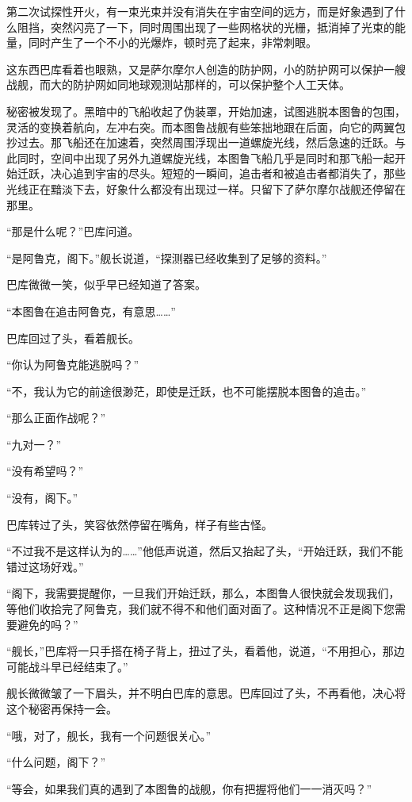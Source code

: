 第二次试探性开火，有一束光束并没有消失在宇宙空间的远方，而是好象遇到了什么阻挡，突然闪亮了一下，同时周围出现了一些网格状的光栅，抵消掉了光束的能量，同时产生了一个不小的光爆炸，顿时亮了起来，非常刺眼。 

这东西巴库看着也眼熟，又是萨尔摩尔人创造的防护网，小的防护网可以保护一艘战舰，而大的防护网如同地球观测站那样的，可以保护整个人工天体。 

秘密被发现了。黑暗中的飞船收起了伪装罩，开始加速，试图逃脱本图鲁的包围，灵活的变换着航向，左冲右突。而本图鲁战舰有些笨拙地跟在后面，向它的两翼包抄过去。那飞船还在加速着，突然周围浮现出一道螺旋光线，然后急速的迁跃。与此同时，空间中出现了另外九道螺旋光线，本图鲁飞船几乎是同时和那飞船一起开始迁跃，决心追到宇宙的尽头。短短的一瞬间，追击者和被追击者都消失了，那些光线正在黯淡下去，好象什么都没有出现过一样。只留下了萨尔摩尔战舰还停留在那里。 

“那是什么呢？”巴库问道。 

“是阿鲁克，阁下。”舰长说道，“探测器已经收集到了足够的资料。” 

巴库微微一笑，似乎早已经知道了答案。 

“本图鲁在追击阿鲁克，有意思……” 

巴库回过了头，看着舰长。 

“你认为阿鲁克能逃脱吗？” 

“不，我认为它的前途很渺茫，即使是迁跃，也不可能摆脱本图鲁的追击。” 

“那么正面作战呢？” 

“九对一？” 

“没有希望吗？” 

“没有，阁下。” 

巴库转过了头，笑容依然停留在嘴角，样子有些古怪。 

“不过我不是这样认为的……”他低声说道，然后又抬起了头，“开始迁跃，我们不能错过这场好戏。” 

“阁下，我需要提醒你，一旦我们开始迁跃，那么，本图鲁人很快就会发现我们，等他们收拾完了阿鲁克，我们就不得不和他们面对面了。这种情况不正是阁下您需要避免的吗？” 

“舰长，”巴库将一只手搭在椅子背上，扭过了头，看着他，说道，“不用担心，那边可能战斗早已经结束了。” 

舰长微微皱了一下眉头，并不明白巴库的意思。巴库回过了头，不再看他，决心将这个秘密再保持一会。 

“哦，对了，舰长，我有一个问题很关心。” 

“什么问题，阁下？” 

“等会，如果我们真的遇到了本图鲁的战舰，你有把握将他们一一消灭吗？” 

